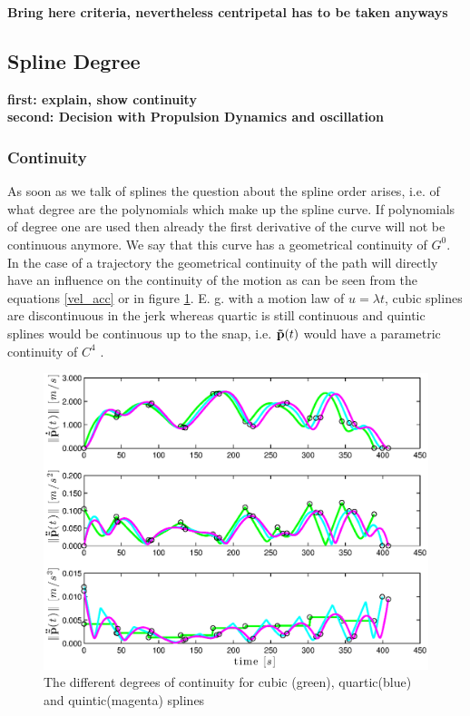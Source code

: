 { \bf Bring here criteria, nevertheless centripetal has to be taken anyways}


\subsection{Spline Degree}
{\bf first: explain, show continuity\\
second: Decision with Propulsion Dynamics and oscillation}
\subsubsection{Continuity}
As soon as we talk of splines the question about the spline order arises, i.e. of what degree are the polynomials which make up the spline curve. If polynomials of degree one are used then already the first derivative of the curve will not be continuous anymore. We say that this curve has a geometrical continuity of $G^0$. In the case of a trajectory the geometrical continuity of the path will directly have an influence on the continuity of the motion as can be seen from the equations \eqref{vel_acc} or in figure \ref{fig:continuity}. E. g. with a motion law of $u=\lambda t$, cubic splines are discontinuous in the jerk whereas quartic is still continuous and quintic splines would be continuous up to the snap, i.e. ${\bf \tilde{p}}(t)$ would have a parametric continuity of $C^4$ . 

\begin{figure}[H]
  \begin{minipage}[t]{0.96\textwidth}
    \includegraphics[width = \textwidth]{graphics/continuity.eps}
  \end{minipage}
  \caption{The different degrees of continuity for cubic (green), quartic(blue) and quintic(magenta) splines}
  \label{fig:continuity}
\end{figure}



